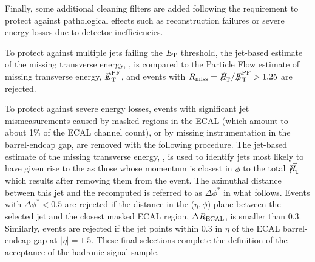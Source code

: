 Finally, some additional cleaning filters are added following
the \alphat requirement to protect against pathological effects such
as reconstruction failures or severe energy losses due to detector
inefficiencies. 

To protect against multiple jets failing the ${E_{\text T}}$ threshold, the
jet-based estimate of the missing transverse energy, \mht, is compared
to the Particle Flow estimate of missing transverse energy, $\pfmet$,
and events with $R_{\rm miss}=\mht/\pfmet > 1.25$ are rejected.

To protect against severe energy losses, events with significant jet
mismeasurements caused by masked regions in the ECAL (which amount to
about 1\% of the ECAL channel count), or by missing instrumentation in
the barrel-endcap gap, are removed with the following procedure. The
jet-based estimate of the missing transverse energy, \mht, is used to
identify jets most likely to have given rise to the \mht as those
whose momentum is closest in $\phi$ to the total $\vec{\mht}$ which
results after removing them from the event.  The azimuthal distance
between this jet and the recomputed \mht is referred to as
$\Delta\phi^*$ in what follows. Events with $\Delta\phi^* < 0.5$ are
rejected if the distance in the ($\eta,\phi$) plane between the
selected jet and the closest masked ECAL region, $\Delta R_{\rm
  ECAL}$, is smaller than 0.3. Similarly, events are rejected if the
jet points within 0.3 in $\eta$ of the ECAL barrel-endcap gap at
$|\eta| = 1.5$. These final selections complete the definition of the
acceptance of the hadronic signal sample.



